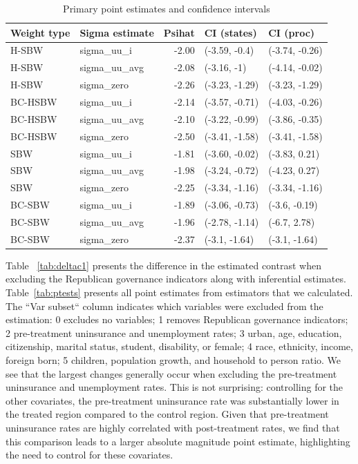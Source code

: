 \documentclass{article}
\begin{document}
\begin{appendix}
\begin{table}[ht]
\centering
\caption{Primary point estimates and confidence intervals}
\label{tab:confintmain}
\begin{tabular}{llrll}
  \hline
Weight type & Sigma estimate & Psihat & CI (states) & CI (proc) \\ 
  \hline
H-SBW & sigma\_uu\_i & -2.00 & (-3.59, -0.4) & (-3.74, -0.26) \\ 
  H-SBW & sigma\_uu\_avg & -2.08 & (-3.16, -1) & (-4.14, -0.02) \\ 
  H-SBW & sigma\_zero & -2.26 & (-3.23, -1.29) & (-3.23, -1.29) \\ 
  BC-HSBW & sigma\_uu\_i & -2.14 & (-3.57, -0.71) & (-4.03, -0.26) \\ 
  BC-HSBW & sigma\_uu\_avg & -2.10 & (-3.22, -0.99) & (-3.86, -0.35) \\ 
  BC-HSBW & sigma\_zero & -2.50 & (-3.41, -1.58) & (-3.41, -1.58) \\ 
  SBW & sigma\_uu\_i & -1.81 & (-3.60, -0.02) & (-3.83, 0.21) \\ 
  SBW & sigma\_uu\_avg & -1.98 & (-3.24, -0.72) & (-4.23, 0.27) \\ 
  SBW & sigma\_zero & -2.25 & (-3.34, -1.16) & (-3.34, -1.16) \\ 
  BC-SBW & sigma\_uu\_i & -1.89 & (-3.06, -0.73) & (-3.6, -0.19) \\ 
  BC-SBW & sigma\_uu\_avg & -1.96 & (-2.78, -1.14) & (-6.7, 2.78) \\ 
  BC-SBW & sigma\_zero & -2.37 & (-3.1, -1.64) & (-3.1, -1.64) \\ 
   \hline
\end{tabular}
\end{table}

Table ~\ref{tab:deltac1} presents the difference in the estimated contrast when excluding the Republican governance indicators along with inferential estimates. Table~\ref{tab:ptests} presents all point estimates from estimators that we calculated. The ``Var subset`` column indicates which variables were excluded from the estimation: 0 excludes no variables; 1 removes Republican governance indicators; 2 pre-treatment uninsurance and unemployment rates; 3 urban, age, education, citizenship, marital status, student, disability, or female; 4 race, ethnicity, income, foreign born; 5 children, population growth, and household to person ratio. We see that the largest changes generally occur when excluding the pre-treatment uninsurance and unemployment rates. This is not surprising: controlling for the other covariates, the pre-treatment uninsurance rate was substantially lower in the treated region compared to the control region. Given that pre-treatment uninsurance rates are highly correlated with post-treatment rates, we find that this comparison leads to a larger absolute magnitude point estimate, highlighting the need to control for these covariates.


\end{appendix}
\end{document}
